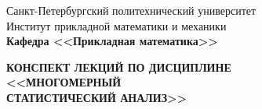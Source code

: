 \documentclass[main.tex]{subfiles}
\begin{document}
\begin{titlepage}
\begin{center}
	\begin{large}
		Санкт-Петербургский политехнический университет\\
		Институт прикладной математики и механики\\
		\textbf{Кафедра <<Прикладная математика>>}\\
	\end{large}
	\vfill
	\Large{\textbf{КОНСПЕКТ ЛЕКЦИЙ ПО ДИСЦИПЛИНЕ \\
			 <<МНОГОМЕРНЫЙ \\
			 СТАТИСТИЧЕСКИЙ АНАЛИЗ>>}}
\end{center}
\vfill
\begin{figure}[H]
\end{figure}
\vfill
{}
\end{titlepage}
\end{document}
